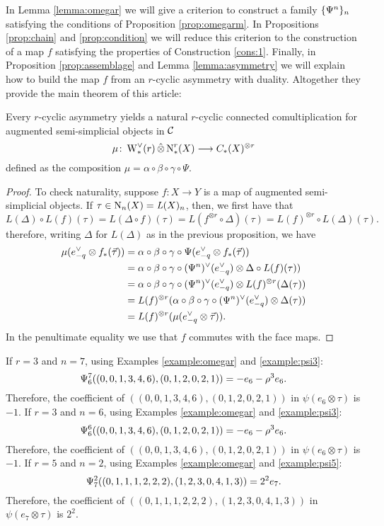 In Lemma \ref{lemma:omegar} we will give a criterion to construct a family $\{\Psiom^n\}_n$ satisfying the conditions of Proposition \ref{prop:omegarm}. In Propositions \ref{prop:chain} and \ref{prop:condition} we will reduce this criterion to the construction of a map $f$ satisfying the properties of Construction \ref{cons:1}. Finally, in Proposition \ref{prop:assemblage} and Lemma \ref{lemma:asymmetry} we will explain how to build the map $f$ from an $r$-cyclic asymmetry with duality. Altogether they provide the main theorem of this article:

\begin{theorem}\label{thm2:mainthm} Every $r$-cyclic asymmetry yields a natural $r$-cyclic connected comultiplication for augmented semi-simplicial objects in $\cC$
\[
	\mu\colon \rWd(r)\hotimes \rchains(X)\lra \ucadenas(X)^{\otimes r}
\]
defined as the composition
	$
	\mu = \alpha\circ\beta\circ\gamma\circ \Psi.
	$
\end{theorem}

\begin{proof}
	To check naturality, suppose $f\colon X\to Y$ is a map of augmented semi-simplicial objects. If $\tau\in \chains[n](X) = \abel(X)_n$, then, we first have that
	\[
		L(\Delta)\circ L(f)(\tau) = L(\Delta\circ f)(\tau) = L(f^{\otimes r}\circ \Delta)(\tau) = L(f)^{\otimes r}\circ L(\Delta)(\tau).
	\]
	therefore, writing $\Delta$ for $L(\Delta)$ as in the previous proposition, we have
	\begin{align*}
	\mu(e^\dd_{-q}\otimes f_*(\vec{\tau}))
		&=	\alpha\circ\beta\circ\gamma\circ \Psi(e_{-q}^\vee\otimes f_*(\vec{\tau}))
		\\
		&= \alpha\circ\beta\circ\gamma\circ(\Psiom^n)^\vee(e_{-q}^\vee)\otimes \Delta\circ L(f)(\tau))
		\\
		&= \alpha\circ\beta\circ\gamma\circ(\Psiom^n)^\vee(e_{-q}^\vee)\otimes L(f)^{\otimes r}(\Delta(\tau))
		\\
		&= L(f)^{\otimes r}(\alpha\circ\beta\circ\gamma\circ(\Psiom^n)^\vee(e_{-q}^\vee)\otimes \Delta(\tau))
		\\
		&= L(f)^{\otimes r}(\mu(e^\dd_{-q}\otimes \vec{\tau})).
	\end{align*}
	In the penultimate equality we use that $f$ commutes with the face maps.
\end{proof}

\begin{example}\label{ex:omegarn} If $r=3$ and $n=7$, using Examples \ref{example:omegar} and \ref{example:psi3}:
	\[
		\Psiom_6^7((0,0,1,3,4,6),(0,1,2,0,2,1)) = -e_6-\rho^3e_6.
	\]
	Therefore, the coefficient of $((0,0,1,3,4,6),(0,1,2,0,2,1))$ in $\psi(e_6\otimes \tau)$ is $-1$.
 If $r=3$ and $n=6$, using Examples \ref{example:omegar} and \ref{example:psi3}:
	\[
		\Psiom_6^6((0,0,1,3,4,6),(0,1,2,0,2,1)) = -e_6-\rho^3e_6.
	\]
	Therefore, the coefficient of $((0,0,1,3,4,6),(0,1,2,0,2,1))$ in $\psi(e_6\otimes \tau)$ is $-1$.
 If $r=5$ and $n=2$, using Examples \ref{example:omegar} and \ref{example:psi5}:
	\[
		\Psiom_7^2((0,1,1,1,2,2,2),(1,2,3,0,4,1,3)) = 2^2e_7.
	\]
Therefore, the coefficient of $((0,1,1,1,2,2,2),(1,2,3,0,4,1,3))$ in $\psi(e_7\otimes\tau)$ is $2^2$.
\end{example}

